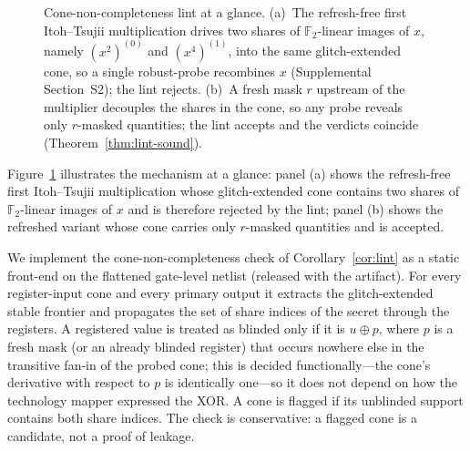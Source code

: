 \documentclass[lettersize,journal]{IEEEtran}
\begin{document}
\begin{figure}[t]
{}
\caption{Cone-non-completeness lint at a glance. (a)~The refresh-free
first Itoh--Tsujii multiplication drives two shares of
$\mathbb{F}_{2}$-linear images of $x$, namely $(x^{2})^{(0)}$ and
$(x^{4})^{(1)}$, into the same glitch-extended cone, so a single
robust-probe recombines $x$ (Supplemental Section~S2); the lint rejects.  (b)~A fresh
mask $r$ upstream of the multiplier decouples the shares in the
cone, so any probe reveals only $r$-masked quantities; the lint
accepts and the verdicts coincide (Theorem~\ref{thm:lint-sound}).}
\label{fig:cone-gap}
\end{figure}

Figure~\ref{fig:cone-gap} illustrates the mechanism at a glance:
panel (a) shows the refresh-free first Itoh--Tsujii multiplication
whose glitch-extended cone contains two shares of
$\mathbb{F}_{2}$-linear images of $x$ and is therefore rejected by
the lint; panel (b) shows the refreshed variant whose cone carries
only $r$-masked quantities and is accepted.

We implement the cone-non-completeness check of
Corollary~\ref{cor:lint} as a static front-end on the flattened gate-level
netlist (released with the artifact). For every register-input cone and every
primary output it extracts the glitch-extended stable frontier and propagates
the set of share indices of the secret through the registers. A registered
value is treated as blinded only if it is $u\oplus p$, where $p$ is a fresh mask
(or an already blinded register) that occurs nowhere else in the transitive
fan-in of the probed cone; this is decided functionally---the cone's
derivative with respect to $p$ is identically one---so it does not depend on how
the technology mapper expressed the XOR. A cone is flagged if its unblinded
support contains both share indices. The check is conservative: a flagged cone
is a candidate, not a proof of leakage.
\end{document}
